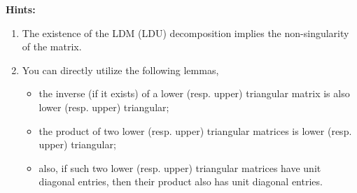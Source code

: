 \documentclass[english,onecolumn]{IEEEtran}
\begin{document}
\textbf{Hints:}  
\begin{enumerate}
    \item The existence of the LDM (LDU) decomposition implies the non-singularity of the matrix.
    \item You can directly utilize the following lemmas,
\begin{itemize}
    \item the inverse (if it exists) of a lower (resp. upper) triangular matrix is also lower (resp. upper) triangular;
    \item the product of two lower (resp. upper) triangular matrices is lower (resp. upper) triangular;
    \item also, if such two lower (resp. upper) triangular matrices have unit diagonal entries, then their product also has unit diagonal entries.
\end{itemize}
\end{enumerate}

  
\end{document}
